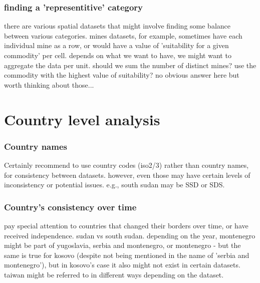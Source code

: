 \subsubsection{finding a 'representitive' category}
there are various spatial datasets that might involve finding some balance between various categories. mines datasets, for example, sometimes have each individual mine as a row, or would have a value of 'suitability for a given commodity' per cell. depends on what we want to have, we might want to aggregate the data per unit. should we sum the number of distinct mines? use the commodity with the highest value of suitability? no obvious answer here but worth thinking about those...

\section{Country level analysis}

\subsubsection{Country names}
Certainly recommend to use country codes (iso2/3) rather than country names, for consistency between datasets. however, even those may have certain levels of inconsistency or potential issues. e.g., south sudan may be SSD or SDS. 

\subsubsection{Country's consistency over time}

pay special attention to countries that changed their borders over time, or have received independence. sudan vs south sudan. depending on the year, montenegro might be part of yugoslavia, serbia and montenegro, or montenegro - but the same is true for kosovo (despite not being mentioned in the name of 'serbia and montenegro'), but in kosovo's case it also might not exist in certain datasets. taiwan might be referred to in different ways depending on the dataset.

